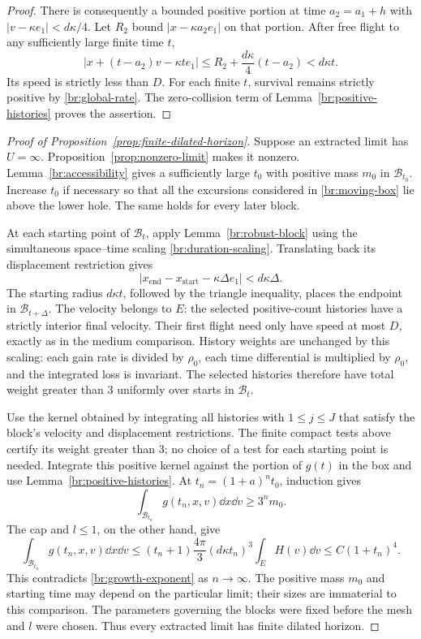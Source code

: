 \begin{proof}
There is consequently a bounded positive portion at time \(a_2=a_1+h\)
with \(|v-\kappa e_1|<d\kappa/4\).
Let \(R_2\) bound \(|x-\kappa a_2e_1|\) on that portion.
After free flight to any sufficiently large finite time \(t\),
\[
|x+(t-a_2)v-\kappa te_1|
\le R_2+\frac{d\kappa}{4}(t-a_2)<d\kappa t.
\]
Its speed is strictly less than \(D\). For each finite \(t\), survival
remains strictly positive by \eqref{br:global-rate}. The zero-collision
term of Lemma~\ref{br:positive-histories} proves the assertion.
\end{proof}

\begin{proof}[Proof of Proposition~\ref{prop:finite-dilated-horizon}]
Suppose an extracted limit has \(U=\infty\).
Proposition~\ref{prop:nonzero-limit} makes it nonzero.
Lemma~\ref{br:accessibility} gives a sufficiently large \(t_0\) with
positive mass \(m_0\) in \(\mathcal B_{t_0}\). Increase \(t_0\) if
necessary so that all the excursions considered in
\eqref{br:moving-box} lie above the lower hole. The same holds for
every later block.

At each starting point of \(\mathcal B_t\), apply
Lemma~\ref{br:robust-block} using the simultaneous space--time scaling
\eqref{br:duration-scaling}. Translating back its displacement
restriction gives
\[
|x_{\mathrm{end}}-x_{\mathrm{start}}-\kappa\Delta e_1|
<d\kappa\Delta.
\]
The starting radius \(d\kappa t\), followed by the triangle inequality,
places the endpoint in \(\mathcal B_{t+\Delta}\).
The velocity belongs to \(E\): the selected positive-count histories
have a strictly interior final velocity. Their first flight need
only have speed at most \(D\), exactly as in the medium comparison.
History weights are unchanged by this scaling: each gain rate is
divided by \(\rho_0\), each time differential is multiplied by
\(\rho_0\), and the integrated loss is invariant. The selected
histories therefore have total weight greater than 3 uniformly over
starts in \(\mathcal B_t\).

Use the kernel obtained by integrating all histories with
\(1\le j\le J\) that satisfy the block's velocity and displacement
restrictions. The finite compact tests above certify its weight
greater than 3; no choice of a test for each starting point is needed.
Integrate this positive kernel against the portion of \(g(t)\) in
the box and use Lemma~\ref{br:positive-histories}.
At \(t_n=(1+a)^nt_0\), induction gives
\[
\int_{\mathcal B_{t_n}}g(t_n,x,v)\dd x\dd v\ge3^n m_0.
\]
The cap and \(l\le1\), on the other hand, give
\[
\int_{\mathcal B_{t_n}}g(t_n,x,v)\dd x\dd v
\le (t_n+1)\frac{4\pi}{3}(d\kappa t_n)^3\int_E H(v)\dd v
\le C(1+t_n)^4.
\]
This contradicts \eqref{br:growth-exponent} as \(n\to\infty\).
The positive mass \(m_0\) and starting time may depend on the particular
limit; their sizes are immaterial to this comparison. The parameters
governing the blocks were fixed before the mesh and \(l\) were chosen.
Thus every extracted limit has finite dilated horizon.
\end{proof}
